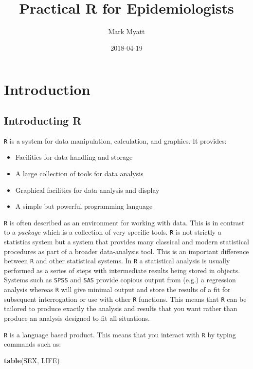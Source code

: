 \documentclass[]{book}
\title{Practical R for Epidemiologists}
\author{Mark Myatt}
\date{2018-04-19}
\newenvironment{Shaded}{\begin{snugshade}}{\end{snugshade}}
\newcommand{\KeywordTok}[1]{\textcolor[rgb]{0.13,0.29,0.53}{\textbf{#1}}}
\newcommand{\NormalTok}[1]{#1}
\theoremstyle{definition}
\theoremstyle{definition}
\theoremstyle{definition}
\theoremstyle{remark}
\begin{document}
\maketitle

{
\setcounter{tocdepth}{1}
\tableofcontents
}
\hypertarget{chapter1}{%
\chapter{Introduction}\label{chapter1}}

\hypertarget{introducting-r}{%
\section{Introducting R}\label{introducting-r}}

\texttt{R} is a system for data manipulation, calculation, and graphics.
It provides:

\begin{itemize}
\item
  Facilities for data handling and storage
\item
  A large collection of tools for data analysis
\item
  Graphical facilities for data analysis and display
\item
  A simple but powerful programming language
\end{itemize}

\texttt{R} is often described as an environment for working with data.
This is in contrast to a \emph{package} which is a collection of very
specific tools. \texttt{R} is not strictly a statistics system but a
system that provides many classical and modern statistical procedures as
part of a broader data-analysis tool. This is an important difference
between \texttt{R} and other statistical systems. In \texttt{R} a
statistical analysis is usually performed as a series of steps with
intermediate results being stored in objects. Systems such as
\texttt{SPSS} and \texttt{SAS} provide copious output from (e.g.) a
regression analysis whereas \texttt{R} will give minimal output and
store the results of a fit for subsequent interrogation or use with
other \texttt{R} functions. This means that \texttt{R} can be tailored
to produce exactly the analysis and results that you want rather than
produce an analysis designed to fit all situations.

\texttt{R} is a language based product. This means that you interact
with \texttt{R} by typing commands such as:

\begin{Shaded}
\begin{Highlighting}[]
\KeywordTok{table}\NormalTok{(SEX, LIFE)}
\end{Highlighting}
\end{Shaded}
\end{document}
